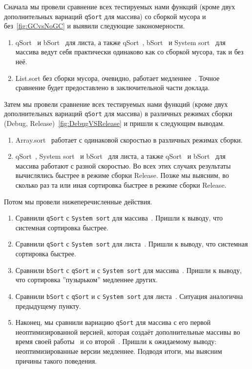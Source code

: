 Сначала мы провели сравнение всех тестируемых нами функций (кроме двух дополнительных вариаций \verb|qSort| для массива) со сборкой мусора и без~\ref{fig:GCvsNoGC} и выявили следующие закономерности.
\begin{enumerate}
  \item qSort~ и bSort~ для листа, а также qSort~, bSort~ и System sort~ для массива ведут себя практически одинаково как со сборкой мусора, так и без неё.
  \item List.sort без сборки мусора, очевидно, работает медленнее~. Точное сравнение будет предоставлено в заключительной части доклада.   
\end{enumerate}
Затем мы провели сравнение всех тестируемых нами функций (кроме двух дополнительных вариаций \verb|qSort| для массива) в различных режимах сборки (Debug, Release)~\ref{fig:DebugVSRelease} и пришли к следующим выводам.
\begin{enumerate}
  \item Array.sort~ работает с одинаковой скоростью в различных режимах сборки.
  \item qSort~, System sort~ и bSort~ для листа, а также qSort~ и bSort~ для массива работают с разной скоростью. Во всех этих случаях результаты вычислялись быстрее в режиме сборки Release. Позже мы выясним, во сколько раз та или иная сортировка быстрее в режиме сборки Release.
\end{enumerate}
Потом мы провели нижеперечисленные действия.
\begin{enumerate}
  \item Сравнили \verb|qSort| с \verb|System sort| для массива~. Пришли к выводу, что системная сортировка быстрее.
  \item Сравнили \verb|qSort| с \verb|System sort| для листа~. Пришли к выводу, что системная сортировка быстрее.
  \item Сравнили \verb|bSort| с \verb|qSort| и с \verb|System sort| для массива~. Пришли к выводу, что сортировка ''пузырьком'' медленнее других.
  \item Сравнили \verb|bSort| с \verb|qSort| и с \verb|System sort| для листа~. Ситуация аналогична предыдущему пункту.
  \item Наконец, мы сравнили вариацию \verb|qSort| для массива с его первой неоптимизированной версией, которая создаёт дополнительные массивы во время своей работы~ и со второй~. Пришли к ожидаемому выводу: неоптимизированные версии медленнее. Подводя итоги, мы выясним причины такого поведения.
\end{enumerate}

